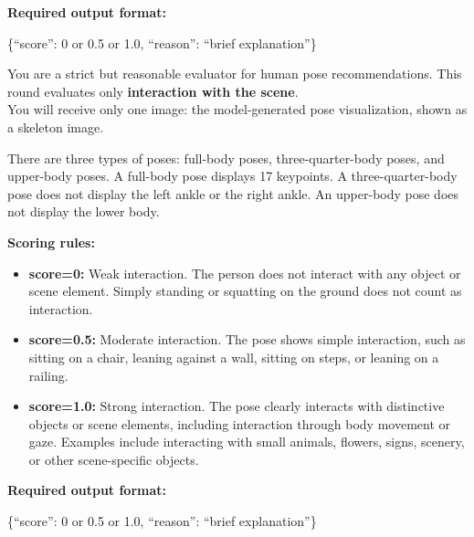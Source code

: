 \documentclass{article} %
\begin{document}
\begin{promptbox}
\textbf{Required output format:}
\begin{flushleft}
\ttfamily\footnotesize
\{``score'': 0 or 0.5 or 1.0, ``reason'': ``brief explanation''\}
\end{flushleft}

\end{promptbox}


\begin{promptbox}
\small

You are a strict but reasonable evaluator for human pose recommendations. This round evaluates only \textbf{interaction with the scene}.\\

You will receive only one image: the model-generated pose visualization, shown as a skeleton image.

There are three types of poses: full-body poses, three-quarter-body poses, and upper-body poses. A full-body pose displays 17 keypoints. A three-quarter-body pose does not display the left ankle or the right ankle. An upper-body pose does not display the lower body.

\textbf{Scoring rules:}
\begin{itemize}
    \item \textbf{score=0:} Weak interaction. The person does not interact with any object or scene element. Simply standing or squatting on the ground does not count as interaction.
    \item \textbf{score=0.5:} Moderate interaction. The pose shows simple interaction, such as sitting on a chair, leaning against a wall, sitting on steps, or leaning on a railing.
    \item \textbf{score=1.0:} Strong interaction. The pose clearly interacts with distinctive objects or scene elements, including interaction through body movement or gaze. Examples include interacting with small animals, flowers, signs, scenery, or other scene-specific objects.
\end{itemize}

\textbf{Required output format:}
\begin{flushleft}
\ttfamily\footnotesize
\{``score'': 0 or 0.5 or 1.0, ``reason'': ``brief explanation''\}
\end{flushleft}

\end{promptbox}
\end{document}
